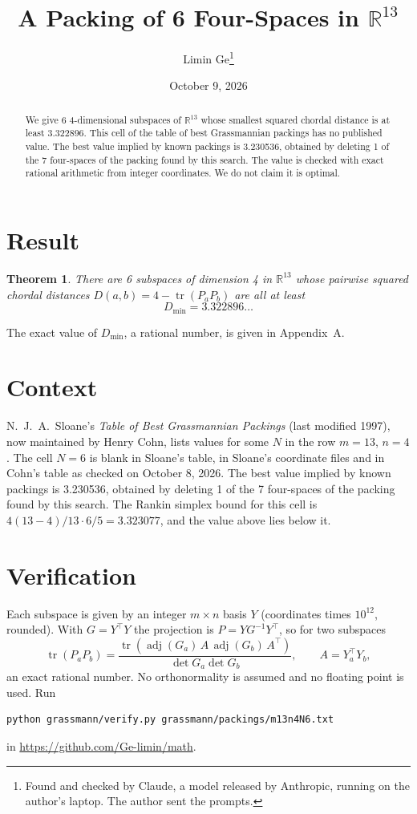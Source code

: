 \documentclass[11pt,a4paper]{article}
\title{A Packing of 6 Four-Spaces in $\mathbb{R}^{13}$}
\author{Limin Ge\thanks{Found and checked by Claude, a model released by Anthropic, running on the author's laptop. The author sent the prompts.}}
\date{October 9, 2026}
\newtheorem*{theorem}{Theorem}
\begin{document}
\maketitle
\begin{abstract}
We give 6 4-dimensional subspaces of $\mathbb{R}^{13}$ whose smallest squared chordal distance is at least 3.322896. This cell of the table of best Grassmannian packings has no published value. The best value implied by known packings is 3.230536, obtained by deleting 1 of the 7 four-spaces of the packing found by this search. The value is checked with exact rational arithmetic from integer coordinates. We do not claim it is optimal.
\end{abstract}

\section{Result}
\begin{theorem}
There are 6 subspaces of dimension 4 in $\mathbb{R}^{13}$ whose pairwise squared chordal distances $D(a,b) = 4 - \operatorname{tr}(P_aP_b)$ are all at least
\[ D_{\min} = 3.322896\ldots \]
\end{theorem}
The exact value of $D_{\min}$, a rational number, is given in Appendix~A.


\section{Context}
N.~J.~A.~Sloane's \emph{Table of Best Grassmannian Packings} (last modified 1997), now maintained by Henry Cohn, lists values for some $N$ in the row $m=13$, $n=4$. The cell $N=6$ is blank in Sloane's table, in Sloane's coordinate files and in Cohn's table as checked on October 8, 2026. The best value implied by known packings is 3.230536, obtained by deleting 1 of the 7 four-spaces of the packing found by this search. The Rankin simplex bound for this cell is $4(13-4)/13\cdot 6/5 = 3.323077$, and the value above lies below it.


\section{Verification}
Each subspace is given by an integer $m\times n$ basis $Y$ (coordinates times $10^{12}$, rounded). With $G=Y^\top Y$ the projection is $P=YG^{-1}Y^\top$, so for two subspaces
\[ \operatorname{tr}(P_aP_b)=\frac{\operatorname{tr}(\operatorname{adj}(G_a)\,A\,\operatorname{adj}(G_b)\,A^\top)}{\det G_a\det G_b},\qquad A=Y_a^\top Y_b, \]
an exact rational number. No orthonormality is assumed and no floating point is used. Run
\begin{verbatim}
python grassmann/verify.py grassmann/packings/m13n4N6.txt
\end{verbatim}
in \url{https://github.com/Ge-limin/math}.
\end{document}
